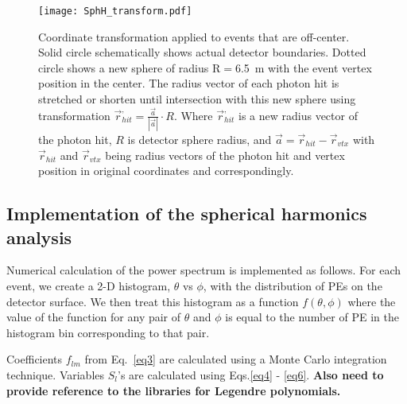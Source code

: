 \begin{figure*}[h]
  \centering
  \texttt{[image: SphH\_transform.pdf]}
  \caption{Coordinate transformation applied to events that are
    off-center. Solid circle schematically shows actual detector
    boundaries. Dotted circle shows a new sphere of radius R$=$6.5~m
    with the event vertex position in the center. The radius vector of
    each photon hit is stretched or shorten until intersection with
    this new sphere using transformation $\vec{r}^{,}_{hit} =
    \frac{\vec{a}}{|\vec{a}|} \cdot R$. Where $\vec{r}^{,}_{hit}$ is a
    new radius vector of the photon hit, $R$ is detector sphere radius,
    and $\vec{a}=\vec{r}_{hit} - \vec{r}_{vtx}$ with $\vec{r}_{hit}$
    and $\vec{r}_{vtx}$ being radius vectors of the photon hit and
    vertex position in original coordinates and correspondingly.}
  \label{fig:SphH_transform}
\end{figure*}


\subsection{Implementation of the spherical harmonics analysis}

Numerical calculation of the power spectrum is implemented as follows.
For each event, we create a 2-D histogram, $\theta$ vs $\phi$, with the distribution of PEs on the detector surface. We then treat this 
histogram as a function $f(\theta,\phi)$ where the value of the function for any pair of $\theta$ and $\phi$ is equal to the number of 
PE in the histogram bin corresponding to that pair.

Coefficients $f_{lm}$ from Eq.~\ref{eq3} are calculated using a Monte Carlo integration technique. Variables $S_l$'s are calculated using 
Eqs.\ref{eq4} - \ref{eq6}. {\bf Also need to provide reference to the libraries for Legendre polynomials.}


